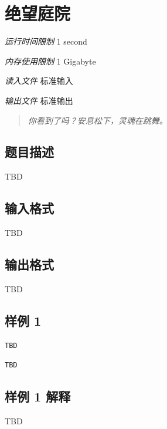 \section[A. 绝望庭院]{ 绝望庭院}

\textit{运行时间限制}   1 second

\textit{内存使用限制} 1 Gigabyte

\textit{读入文件} \qquad 标准输入

\textit{输出文件} \qquad 标准输出


\begin{quote}
	\textit{你看到了吗？安息松下，灵魂在跳舞。}
\end{quote}

\subsection{题目描述}

TBD



\subsection{输入格式}

TBD

\subsection{输出格式}

TBD

\subsection{样例 1}

\begin{minipage}{\linewidth}
	\begin{minipage}[t]{0.49\linewidth}
		\begin{lstlisting}[title=\texttt{standard input}]
TBD
\end{lstlisting}
	\end{minipage}
	\begin{minipage}[t]{0.49\linewidth}
		\begin{lstlisting}[title=\texttt{standard output}]
TBD
\end{lstlisting}
	\end{minipage}
\end{minipage}


\subsection{样例 1 解释}

TBD


